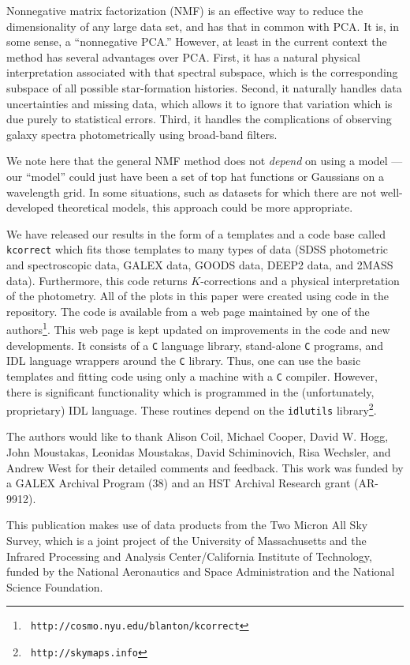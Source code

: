 \documentclass[10pt,preprint]{aastex}
\begin{document}
Nonnegative matrix factorization (NMF) is an effective way to reduce
the dimensionality of any large data set, and has that in common with
PCA.  It is, in some sense, a ``nonnegative PCA.''  However, at least
in the current context the method has several advantages over
PCA. First, it has a natural physical interpretation associated with
that spectral subspace, which is the corresponding subspace of all
possible star-formation histories. Second, it naturally handles data
uncertainties and missing data, which allows it to ignore that
variation which is due purely to statistical errors.  Third, it
handles the complications of observing galaxy spectra photometrically
using broad-band filters. 

We note here that the general NMF method does not {\it depend} on
using a model --- our ``model'' could just have been a set of top hat
functions or Gaussians on a wavelength grid. In some situations, such
as datasets for which there are not well-developed theoretical models,
this approach could be more appropriate.

We have released our results in the form of a templates and a code
base called {\tt kcorrect} which fits those templates to many types of
data (SDSS photometric and spectroscopic data, GALEX data, GOODS data,
DEEP2 data, and 2MASS data). Furthermore, this code returns
$K$-corrections and a physical interpretation of the photometry. All
of the plots in this paper were created using code in the
repository. The code is available from a web page maintained by one of
the authors\footnote{{\tt
http://cosmo.nyu.edu/blanton/kcorrect}}. This web page is kept updated
on improvements in the code and new developments. It consists of a
{\tt C} language library, stand-alone {\tt C} programs, and IDL
language wrappers around the {\tt C} library. Thus, one can use the
basic templates and fitting code using only a machine with a {\tt C}
compiler. However, there is significant functionality which is
programmed in the (unfortunately, proprietary) IDL language. These
routines depend on the {\tt idlutils} library\footnote{{\tt
http://skymaps.info}}.

\acknowledgments

The authors would like to thank Alison Coil, Michael Cooper, David
W. Hogg, John Moustakas, Leonidas Moustakas, David Schiminovich, Risa
Wechsler, and Andrew West for their detailed comments and
feedback. This work was funded by a GALEX Archival Program (38) and an
HST Archival Research grant (AR-9912).

This publication makes use of data products from the Two Micron All
Sky Survey, which is a joint project of the University of
Massachusetts and the Infrared Processing and Analysis
Center/California Institute of Technology, funded by the National
Aeronautics and Space Administration and the National Science
Foundation.
\end{document}
